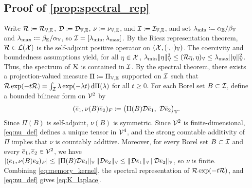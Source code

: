 \subsection{Proof of \cref{prop:spectral_rep}}\label{app:spectral_rep}

Write ${\mathcal{R}}\coloneqq{\mathcal{R}}_{\mathbb{V},\mathbb{E}}$, ${\mathcal{D}}\coloneqq{\mathcal{D}}_{\mathbb{V},\mathbb{E}}$, $\nu\coloneqq\nu_{\mathbb{V},\mathbb{E}}$, and ${\mathcal{I}}\coloneqq {\mathcal{I}}_{\mathbb{V},\mathbb{E}}$, and set $\lambda_{\min}\coloneqq \alpha_{\mathbb{E}}/\beta_{\mathbb{V}}$ and $\lambda_{\max}\coloneqq \beta_{\mathbb{E}}/\alpha_{\mathbb{V}}$, so ${\mathcal{I}}=[\lambda_{\min},\lambda_{\max}]$. By the Riesz representation theorem, ${\mathcal{R}}\in{\mathcal{L}}({\mathcal{X}})$ is the self-adjoint positive operator on $({\mathcal{X}},(\cdot,\cdot)_{\mathbb{V}})$. The coercivity and boundedness assumptions yield, for all $\eta\in{\mathcal{X}}$, $\lambda_{\min}\|\eta\|_{\mathbb{V}}^2
\leq ({\mathcal{R}}\eta,\eta)_{\mathbb{V}}
\leq \lambda_{\max}\|\eta\|_{\mathbb{V}}^2$.
Thus, the spectrum of ${\mathcal{R}}$ is contained in ${\mathcal{I}}$. By the spectral theorem, there exists a projection-valued measure $\Pi\coloneqq\Pi_{\mathbb{V},\mathbb{E}}$ supported on ${\mathcal{I}}$ such that ${\mathcal{R}}\exp(-t{\mathcal{R}})=\int_{{\mathcal{I}}} \lambda \exp(-\lambda t)\,\mathrm{d}\Pi(\lambda)$ for all $t\ge 0$. For each Borel set $B\subset{\mathcal{I}}$, define a bounded bilinear form on ${\mathcal{V}}^{2}$ by
\begin{equation}\label{eq:nu_def}
(\overline{e}_1, \nu(B)\overline{e}_2)_F\coloneqq\bigl(\Pi(B){\mathcal{D}} \overline{e}_1,\ {\mathcal{D}} \overline{e}_2\bigr)_{\mathbb{V}}.
\end{equation}
Since $\Pi(B)$ is self-adjoint, $\nu(B)$ is symmetric. Since ${\mathcal{V}}^{2}$ is finite-dimensional, \cref{eq:nu_def} defines a unique tensor in ${\mathcal{V}}^4$, and the strong countable additivity of $\Pi$ implies that $\nu$ is countably additive. Moreover, for every Borel set $B\subset{\mathcal{I}}$ and every $\overline e_1,\overline e_2\in{\mathcal{V}}^{2}$, we have $|(\overline e_1, \nu(B)\overline e_2)_F|\le \|\Pi(B){\mathcal{D}}\overline e_1\|_{\mathbb{V}}\,\|{\mathcal{D}}\overline e_2\|_{\mathbb{V}}\le \|{\mathcal{D}}\overline e_1\|_{\mathbb{V}}\,\|{\mathcal{D}}\overline e_2\|_{\mathbb{V}}$, so $\nu$ is finite. Combining \cref{eq:memory_kernel}, the spectral representation of ${\mathcal{R}}\exp(-t{\mathcal{R}})$, and \cref{eq:nu_def} gives \cref{eq:K_laplace}.

